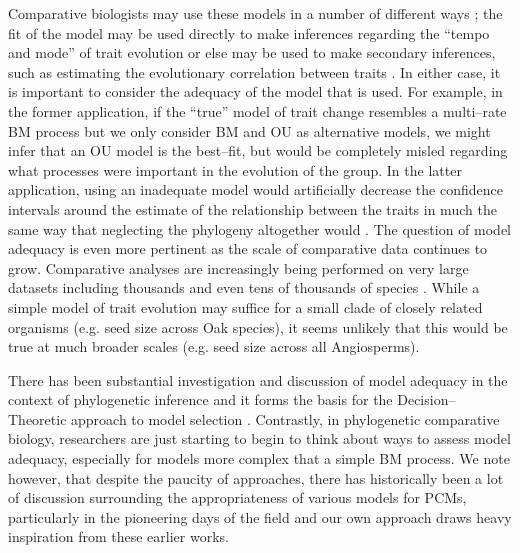 \documentclass[a4paper,12pt]{article}
\begin{document}
Comparative biologists may use these models in a number of different ways \citep{Freckleton2011, PennellHarmon}; the fit of the model may be used directly to make inferences regarding the ``tempo and mode'' of trait evolution \citep{HansenMartins1996, Mooers1999, Harmon2010} or else may be used to make secondary inferences, such as estimating the evolutionary correlation between traits \citep{Felsenstein1985}. In either case, it is important to consider the adequacy of the model that is used. For example, in the former application, if the ``true'' model of trait change resembles a multi--rate BM process \citep{Omeara2006, Thomas2006, Eastman2011} but we only consider BM and OU as alternative models, we might infer that an OU model is the best--fit, but would be completely misled regarding what processes were important in the evolution of the group. In the latter application, using an inadequate model would artificially decrease the confidence intervals around the estimate of the relationship between the traits in much the same way that neglecting the phylogeny altogether would \citep{Rohlf2006}. The question of model adequacy is even more pertinent as the scale of comparative data continues to grow. Comparative analyses are increasingly being performed on very large datasets including thousands and even tens of thousands of species \citep[e.g.][]{Coopermammal, Jetz2012, Rabosky2013, Cornwell2013, PyronBurbrink2013, Zanne2013}. While a simple model of trait evolution may suffice for a small clade of closely related organisms (e.g. seed size across Oak species), it seems unlikely that this would be true at much broader scales (e.g. seed size across all Angiosperms). 

There has been substantial investigation and discussion of model adequacy in the context of phylogenetic inference \citep[e.g.][]{GautLewis1995, SullivanSwofford, Goldman, HuelsenbeckBull1996, SandersonKim, Bollback2002, Ripplinger2010, Lewis2013, Brown2013} and it forms the basis for the Decision--Theoretic approach to model selection \citep{Minin2003, SullivanJoyce2005}. Contrastly, in phylogenetic comparative biology, researchers are just starting to begin to think about ways to assess model adequacy, especially for models more complex that a simple BM process. We note however, that despite the paucity of approaches, there has historically been a lot of discussion surrounding the appropriateness of various models for PCMs, particularly in the pioneering days of the field \citep[e.g.][]{Felsenstein1985, Felsenstein1988, HarveyPagel1991, Pagel1993, Diaz1996, Price1997, GarlandIves2000, Hansen2012} and our own approach draws heavy inspiration from these earlier works.
\end{document}
